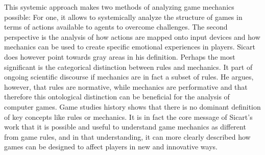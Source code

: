 This systemic approach makes two methods of analyzing game mechanics possible: For one, it allows to systemically analyze the structure of games in terms of actions available to agents to overcome challenges. The second perspective is the analysis of how actions are mapped onto input devices and how mechanics can be used to create specific emotional experiences in players. Sicart does however point towards gray areas in his definition. Perhaps the most significant is the categorical distinction between rules and mechanics. It part of ongoing scientific discourse if mechanics are in fact a subset of rules. He argues, however, that rules are normative, while mechanics are performative and that therefore this ontological distinction can be beneficial for the analysis of computer games. Game studies history shows that there is no dominant definition of key concepts like rules or mechanics. It is in fact the core message of Sicart's work that it is possible and useful to understand game mechanics as different from game rules, and in that understanding, it can more clearly described how games can be designed to affect players in new and innovative ways.~\cite{Sicart2008}
